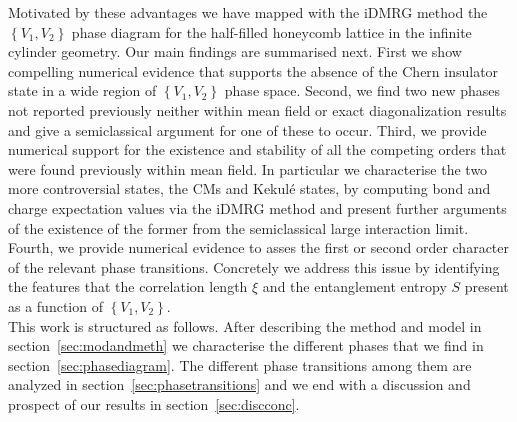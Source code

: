 \documentclass[aps,prx,10pt,twocolumn,floatfix,superscriptaddress,showpacs,numerical,footinbib]{revtex4-1}
\begin{document}
%
Motivated by these advantages we have mapped with the iDMRG method the $\left\lbrace V_{1},V_{2}\right\rbrace$ phase diagram for the half-filled honeycomb lattice in the infinite cylinder geometry.
%
Our main findings are summarised next.
%
First we show compelling numerical evidence that supports the absence of the Chern insulator state in a wide region of $\left\lbrace V_{1},V_{2}\right\rbrace$ phase space.
%
Second, we find two new phases not reported previously neither within mean field or exact diagonalization results and give a semiclassical argument for one 
of these to occur.
%
Third, we provide numerical support for the existence and stability of all the competing orders that were found previously within mean field.
%
In particular we characterise the two more controversial states, the CMs and Kekul\'{e} states, by computing bond and charge expectation values via the iDMRG method 
and present further arguments of the existence of the former from the semiclassical large interaction limit.
%
Fourth, we provide numerical evidence to asses the first or second order character of the relevant phase transitions.
%
Concretely we address this issue by identifying the features that the correlation length $\xi$ and the entanglement entropy $S$ present as a function of $\left\lbrace V_{1},V_{2}\right\rbrace$.\\

This work is structured as follows. 
%
After describing the method and model in section~\ref{sec:modandmeth} we
characterise the different phases that we find in section~\ref{sec:phasediagram}.
%
The different phase transitions among them are analyzed in section~\ref{sec:phasetransitions}
and we end with a discussion and prospect of our results in section~\ref{sec:discconc}.
\end{document}
